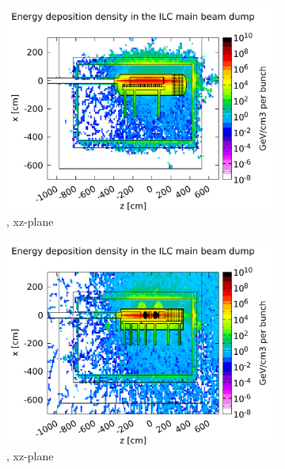 \begin{figure}[!hb]
 \centering
  \begin{subfigure}[b]{0.49\textwidth}
   \centering
    \includegraphics[width=\textwidth]{Figures/BeamDump/Energy_deposition_xz_Design1.pdf}
   \caption{\designone, xz-plane}
   \end{subfigure}
   \hfill
    \begin{subfigure}[b]{0.49\textwidth}
   \centering
    \includegraphics[width=\textwidth]{Figures/BeamDump/Energy_deposition_xz_Design2.pdf}
   \caption{\designtwo, xz-plane}
   \end{subfigure}\\ \vspace*{0.3cm}
     \begin{subfigure}[b]{0.485\textwidth}

\end{subfigure}
\end{figure}
